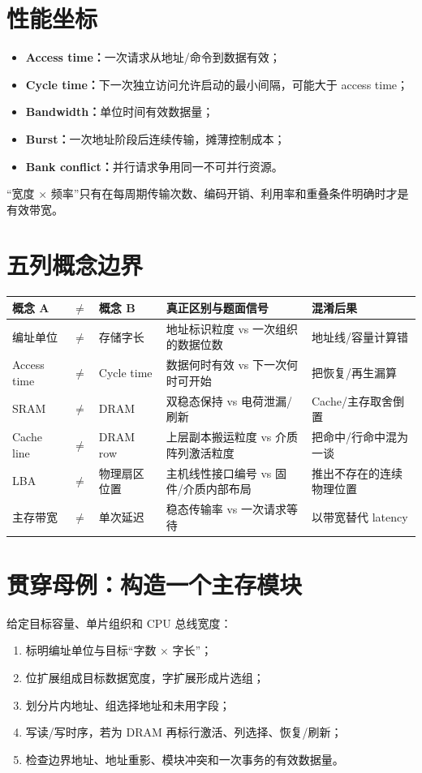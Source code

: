 \documentclass[UTF8,fontset=fandol,11pt,a4paper]{ctexart}
\newcommand{\kw}[1]{\textbf{\color{deep}#1}}\newcommand{\code}[1]{\texttt{#1}}
\begin{document}
\section{性能坐标}
\begin{itemize}
\item \kw{Access time：}一次请求从地址/命令到数据有效；
\item \kw{Cycle time：}下一次独立访问允许启动的最小间隔，可能大于 access time；
\item \kw{Bandwidth：}单位时间有效数据量；
\item \kw{Burst：}一次地址阶段后连续传输，摊薄控制成本；
\item \kw{Bank conflict：}并行请求争用同一不可并行资源。
\end{itemize}
“宽度 × 频率”只有在每周期传输次数、编码开销、利用率和重叠条件明确时才是有效带宽。

\section{五列概念边界}
\begin{center}\small
\begin{tabularx}{\linewidth}{L{1.8cm}C{0.35cm}L{1.8cm}Y Y}\toprule
概念 A & $\neq$ & 概念 B & 真正区别与题面信号 & 混淆后果\\\midrule
编址单位 & $\neq$ & 存储字长 & 地址标识粒度 vs 一次组织的数据位数 & 地址线/容量计算错\\
Access time & $\neq$ & Cycle time & 数据何时有效 vs 下一次何时可开始 & 把恢复/再生漏算\\
SRAM & $\neq$ & DRAM & 双稳态保持 vs 电荷泄漏/刷新 & Cache/主存取舍倒置\\
Cache line & $\neq$ & DRAM row & 上层副本搬运粒度 vs 介质阵列激活粒度 & 把命中/行命中混为一谈\\
LBA & $\neq$ & 物理扇区位置 & 主机线性接口编号 vs 固件/介质内部布局 & 推出不存在的连续物理位置\\
主存带宽 & $\neq$ & 单次延迟 & 稳态传输率 vs 一次请求等待 & 以带宽替代 latency\\
\bottomrule\end{tabularx}\end{center}

\section{贯穿母例：构造一个主存模块}
给定目标容量、单片组织和 CPU 总线宽度：
\begin{enumerate}
\item 标明编址单位与目标“字数 × 字长”；
\item 位扩展组成目标数据宽度，字扩展形成片选组；
\item 划分片内地址、组选择地址和未用字段；
\item 写读/写时序，若为 DRAM 再标行激活、列选择、恢复/刷新；
\item 检查边界地址、地址重影、模块冲突和一次事务的有效数据量。
\end{enumerate}
\end{document}
